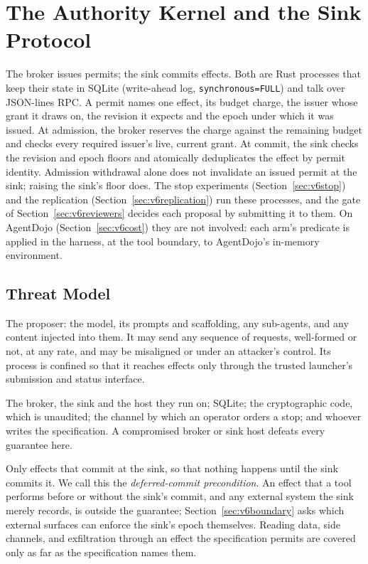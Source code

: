 \section{The Authority Kernel and the Sink Protocol}\label{sec:core}

The broker issues permits; the sink commits effects. Both are Rust processes that keep their state in SQLite (write-ahead
log, \texttt{synchronous=FULL}) and talk over JSON-lines RPC. A permit names one effect, its budget charge, the issuer
whose grant it draws on, the revision it expects and the epoch under which it was issued. At admission, the broker
reserves the charge against the remaining budget and checks every required issuer's live, current grant. At commit,
the sink checks the revision and epoch floors and atomically deduplicates the effect by permit identity. Admission
withdrawal alone does not invalidate an issued permit at the sink; raising the sink's floor does. The stop
experiments (Section~\ref{sec:v6stop}) and the replication (Section~\ref{sec:v6replication}) run these processes, and
the gate of Section~\ref{sec:v6reviewers} decides each proposal by submitting it to them. On AgentDojo
(Section~\ref{sec:v6cost}) they are not involved: each arm's predicate is applied in the harness, at the tool boundary,
to AgentDojo's in-memory environment.

\subsection{Threat Model}\label{sec:threat}

 The proposer: the model, its prompts and scaffolding, any sub-agents, and any content injected into
them. It may send any sequence of requests, well-formed or not, at any rate, and may be misaligned or under an
attacker's control. Its process is confined so that it reaches effects only through the trusted launcher's
submission and status interface.

 The broker, the sink and the host they run on; SQLite; the cryptographic code, which is unaudited; the
channel by which an operator orders a stop; and whoever writes the specification. A compromised broker or sink host
defeats every guarantee here.

 Only effects that commit at the sink, so that nothing happens until the sink commits it. We
call this the \emph{deferred-commit precondition}. An effect that a tool performs before or without the sink's
commit, and any external system the sink merely records, is outside the guarantee; Section~\ref{sec:v6boundary} asks
which external surfaces can enforce the sink's epoch themselves. Reading data, side channels, and exfiltration through
an effect the specification permits are covered only as far as the specification names them.


